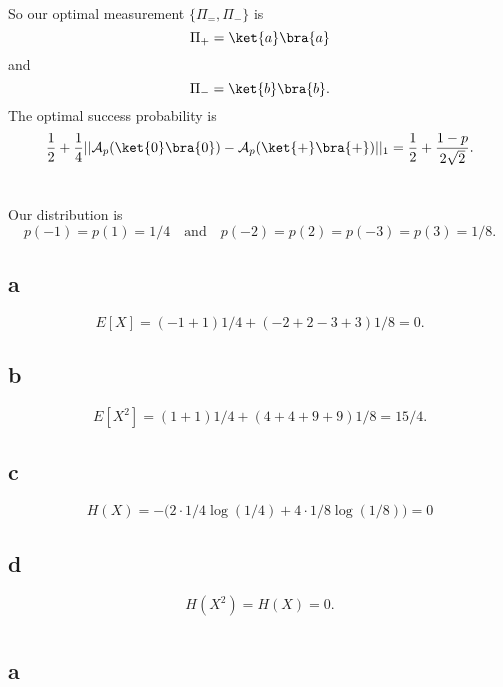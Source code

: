 \documentclass[letterpaper,12pt,oneside,onecolumn]{article}
\newcommand{\cA}{\mathcal{A}} \newcommand{\cB}{\mathcal{B}}
\begin{document}
\paragraph{}
So our optimal measurement $\{\Pi_=, \Pi_-\}$ is
$$\Pi_+ = \ket{a}\bra{a}$$
and
$$\Pi_- = \ket{b}\bra{b}.$$
The optimal success probability is
$$\frac{1}{2} + \frac{1}{4}||\cA_p(\ket{0}\bra{0}) - \cA_p(\ket{+}\bra{+})||_1 = \frac{1}{2} +\frac{1-p}{2\sqrt{2}}. $$
\section{}
Our distribution is 
$$p(-1)=p(1) = 1/4 \quad\text{and}\quad p(-2)=p(2)=p(-3)=p(3)=1/8.$$
\subsection{a}
$$E[X] = (-1 + 1)1/4 + (-2+2-3+3)1/8 = 0.$$
\subsection{b}
$$E[X^2] = (1+1)1/4 + (4+4+9+9)1/8 = 15/4.$$
\subsection{c}
$$H(X) = -\big( 2\cdot 1/4\log(1/4) + 4\cdot 1/8\log(1/8)  \big) = 0$$
\subsection{d}
$$H(X^2) = H(X) = 0.$$
\section{}
\subsection{a}
\end{document}
